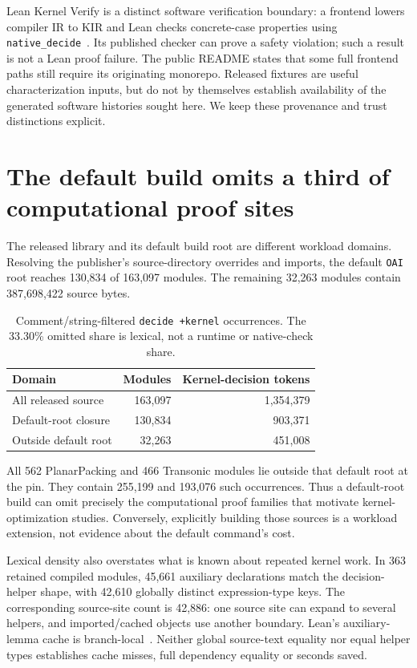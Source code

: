 \documentclass[10pt,twocolumn]{article}
\begin{document}
Lean Kernel Verify is a distinct software verification boundary:
a frontend lowers compiler IR to KIR and Lean checks concrete-case properties
using \texttt{native\_decide}~\cite{leanKernelVerify}.
Its published checker can prove a safety violation; such a result is not a
Lean proof failure. The public README states that some full frontend paths
still require its originating monorepo.
Released fixtures are useful characterization inputs, but do not by
themselves establish availability of the generated software histories sought
here. We keep these provenance and trust distinctions explicit.

\section{The default build omits a third of computational proof sites}
\label{sec:scope}
The released library and its default build root are different workload
domains. Resolving the publisher's source-directory overrides and imports,
the default \texttt{OAI} root reaches 130,834 of 163,097 modules.
The remaining 32,263 modules contain 387,698,422 source bytes.

\begin{table}[t]
\centering\small
\begin{tabular}{@{}lrr@{}}
\toprule
Domain & Modules & Kernel-decision tokens\\
\midrule
All released source &163,097&1,354,379\\
Default-root closure &130,834&903,371\\
Outside default root &32,263&451,008\\
\bottomrule
\end{tabular}
\caption{Comment/string-filtered \texttt{decide +kernel} occurrences.
The 33.30\% omitted share is lexical, not a runtime or native-check share.}
\label{tab:build-domain}
\end{table}

All 562 PlanarPacking and 466 Transonic modules lie outside that default
root at the pin. They contain 255,199 and 193,076 such occurrences.
Thus a default-root build can omit precisely the computational proof
families that motivate kernel-optimization studies.
Conversely, explicitly building those sources is a workload extension,
not evidence about the default command's cost.

Lexical density also overstates what is known about repeated kernel work.
In 363 retained compiled modules, 45,661 auxiliary declarations match the
decision-helper shape, with 42,610 globally distinct expression-type keys.
The corresponding source-site count is 42,886: one source site can expand
to several helpers, and imported/cached objects use another boundary.
Lean's auxiliary-lemma cache is branch-local~\cite{leanDecide434,leanAuxLemma434}.
Neither global source-text equality nor equal helper types establishes
cache misses, full dependency equality or seconds saved.
\end{document}
